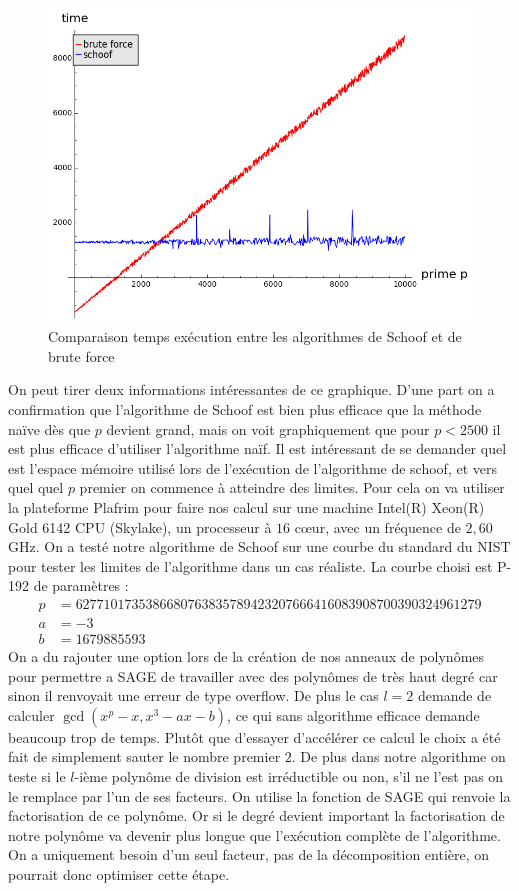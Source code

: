 \documentclass[12pt]{article}
\begin{document}
\begin{figure}[h!]
\caption{Comparaison temps exécution entre les algorithmes de Schoof et de brute force}
\includegraphics[scale=0.6]{pictures/schoof_vs_bruteforce.png} 
\end{figure}
On peut tirer deux informations intéressantes de ce graphique. D'une part on a confirmation que l'algorithme de Schoof est bien plus efficace que la méthode naïve dès que $p$ devient grand, mais on voit graphiquement que pour $p<2500$ il est plus efficace d'utiliser l'algorithme naïf.
\newline
Il est intéressant de se demander quel est l'espace mémoire utilisé lors de l’exécution de l'algorithme de schoof, et vers quel quel $p$ premier on commence à atteindre des limites. Pour cela on va utiliser la plateforme Plafrim pour faire nos calcul sur une machine Intel(R) Xeon(R) Gold 6142 CPU (Skylake), un processeur à $16$ cœur, avec un fréquence de $2,60$ GHz. 
\newline
On a testé notre algorithme de Schoof sur une courbe du standard du NIST pour tester les limites de l'algorithme dans un cas réaliste. La courbe choisi est P-192 de paramètres :
\begin{align*}
p &= 6277101735386680763835789423207666416083908700390324961279\\
a &= -3 \\
b &= 1679885593
\end{align*}
On a du rajouter une option  lors de la création de nos anneaux de polynômes pour permettre a SAGE de travailler avec des polynômes de très haut degré car sinon il renvoyait une erreur de type overflow. De plus le cas $l=2$ demande de calculer  $\gcd(x^p -x, x^3 - ax -b)$, ce qui sans algorithme efficace demande beaucoup trop de temps. Plutôt que d'essayer d’accélérer ce calcul le choix a été fait de simplement sauter le nombre premier $2$. De plus dans notre algorithme on teste si le $l$-ième polynôme de division est irréductible ou non, s'il ne l'est pas on le remplace par l'un de ses facteurs. On utilise la fonction de SAGE  qui renvoie la factorisation de ce polynôme. Or si le degré devient important la factorisation de notre polynôme va devenir plus longue que l’exécution complète de l'algorithme. On a uniquement besoin d'un seul facteur, pas de la décomposition entière, on pourrait donc optimiser cette étape.
\end{document}
